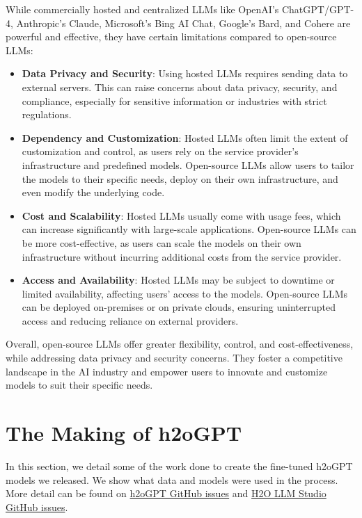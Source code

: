\documentclass{article}
\begin{document}
While commercially hosted and centralized LLMs like OpenAI's ChatGPT/GPT-4, Anthropic's Claude, Microsoft's Bing AI Chat, Google's Bard, and Cohere are powerful and effective, they have certain limitations compared to open-source LLMs:
\begin{itemize}
    \item \textbf{Data Privacy and Security}: Using hosted LLMs requires sending data to external servers. This can raise concerns about data privacy, security, and compliance, especially for sensitive information or industries with strict regulations.
    \item \textbf{Dependency and Customization}: Hosted LLMs often limit the extent of customization and control, as users rely on the service provider's infrastructure and predefined models. Open-source LLMs allow users to tailor the models to their specific needs, deploy on their own infrastructure, and even modify the underlying code.
    \item \textbf{Cost and Scalability}: Hosted LLMs usually come with usage fees, which can increase significantly with large-scale applications. Open-source LLMs can be more cost-effective, as users can scale the models on their own infrastructure without incurring additional costs from the service provider.
    \item  \textbf{Access and Availability}: Hosted LLMs may be subject to downtime or limited availability, affecting users' access to the models. Open-source LLMs can be deployed on-premises or on private clouds, ensuring uninterrupted access and reducing reliance on external providers.
\end{itemize}
Overall, open-source LLMs offer greater flexibility, control, and cost-effectiveness, while addressing data privacy and security concerns. They foster a competitive landscape in the AI industry and empower users to innovate and customize models to suit their specific needs.

\section{The Making of h2oGPT}
In this section, we detail some of the work done to create the fine-tuned h2oGPT models we released. We show what data and models were used in the process.  More detail can be found on \href{https://github.com/h2oai/h2ogpt/issues}{\faGithubSquare h2oGPT GitHub issues} and \href{https://github.com/h2oai/h2o-llmstudio/issues}{\faGithubSquare H2O LLM Studio GitHub issues}.
\label{sec:headings}
\end{document}
